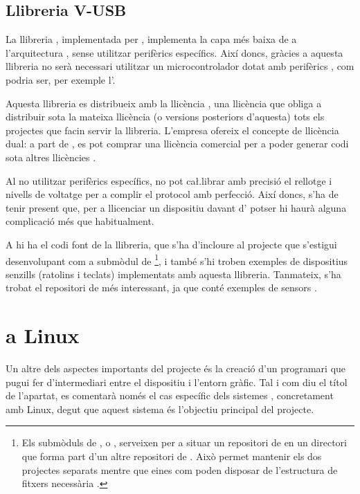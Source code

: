 \subsection{Llibreria V-USB}

La llibreria , implementada per  \cite{Vusb},
implementa la capa més baixa de  a l'arquitectura
, sense utilitzar perifèrics específics. Així doncs, gràcies a aquesta
llibreria no serà necessari utilitzar un microcontrolador  dotat amb
perifèrics , com podria ser, per exemple l'.

Aquesta llibreria 
es distribueix amb la llicència , una llicència que obliga a
distribuir sota la mateixa llicència (o versions posteriors d'aquesta) tots els
projectes que facin servir la llibreria. L'empresa ofereix el concepte de
llicència dual: a part de , es pot comprar una llicència comercial
per a poder generar codi sota altres llicències \cite{VusbLicensing}.

Al no utilitzar perifèrics específics,  no pot ca\l.librar amb
precisió el rellotge i nivells de voltatge per a complir el protocol 
amb perfecció. Així doncs, s'ha de tenir present que, per a llicenciar un
dispositiu davant d' potser hi haurà alguna complicació més que
habitualment.

A \cite{Vusb} hi ha el codi font de la llibreria, que s'ha d'incloure al
projecte que s'estigui desenvolupant com a submòdul de 
\footnote{
    Els submòduls de , o , serveixen per a
    situar un repositori de  en un directori que forma part d'un altre
    repositori de . Això permet mantenir els dos projectes separats
    mentre que eines com  poden disposar de l'estructura de
    fitxers necessària \cite{GitSubmodule}.
}, i també s'hi troben exemples de dispositius
senzills (ratolins i teclats) implementats amb aquesta llibreria. Tanmateix,
s'ha trobat el repositori de \cite{VusbProjects} més interessant, ja que conté
exemples de sensors .

\section{ a Linux}

Un altre dels aspectes importants del projecte és la creació d'un programari
que pugui fer d'intermediari entre el dispositiu i l'entorn gràfic. Tal i com
diu el títol de l'apartat, es comentarà només el cas específic dels sistemes
, concretament amb Linux, degut que aquest sistema és l'objectiu
principal del projecte.

